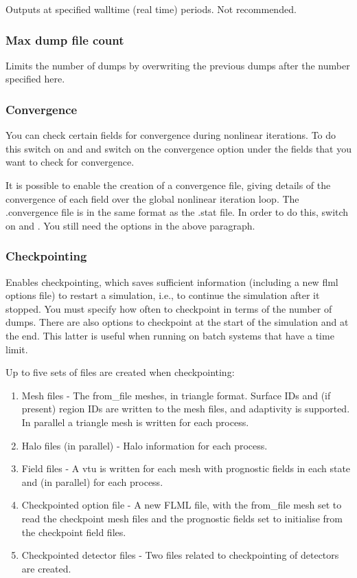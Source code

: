 Outputs at specified walltime (real time) periods. Not recommended.

\subsubsection{Max dump file count}

Limits the number of dumps by overwriting the previous dumps after the number specified here.

\subsubsection{Convergence}

You can check certain fields for convergence during nonlinear iterations.  To do this switch on  and  and switch on the convergence option under the fields that you want to check for convergence. 

It is possible to enable the creation of a convergence file, giving details of the convergence of each field over the global nonlinear iteration loop. The .convergence file is in the same format as the .stat file. In order to do this, switch on 
  and .  You still need the options in the above paragraph.

\subsubsection{Checkpointing}
\label{sect:configuring_fluidity_checkpointing}
Enables checkpointing, which saves sufficient information (including a new flml options file) to restart a simulation, i.e., to continue the simulation after it stopped. You must specify how often to checkpoint in terms of the number of dumps. There
are also options to checkpoint at the start of the simulation and at the
end. This latter is useful when running on batch systems that have a time
limit.

Up to five sets of files are created when checkpointing:
\begin{enumerate}
\item Mesh files - The from\_file meshes, in triangle format. Surface IDs
  and (if present) region IDs are written to the mesh files, and adaptivity
  is supported. In parallel a triangle mesh is written for each process.
\item Halo files (in parallel) - Halo information for each process.
\item Field files - A vtu is written for each mesh with prognostic fields in
  each state and (in parallel) for each process.
\item Checkpointed option file - A new FLML file, with the from\_file mesh
  set to read the checkpoint mesh files and the prognostic fields set
  to initialise from the checkpoint field files.
\item Checkpointed detector files - Two files related to checkpointing of
  detectors are created.
\end{enumerate}

